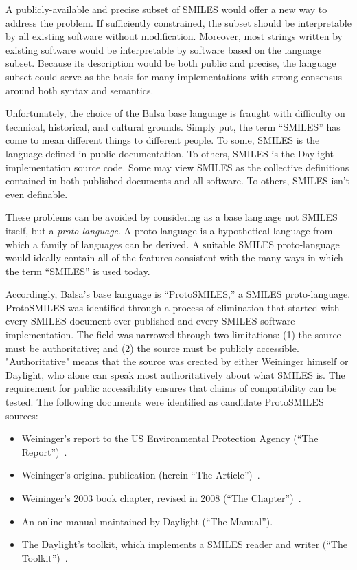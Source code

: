 \documentclass{article}
\begin{document}
A publicly-available and precise subset of SMILES would offer a new way to address the problem. If sufficiently constrained, the subset should be interpretable by all existing software without modification. Moreover, most strings written by existing software would be interpretable by software based on the language subset. Because its description would be both public and precise, the language subset could serve as the basis for many implementations with strong consensus around both syntax and semantics.

Unfortunately, the choice of the Balsa base language is fraught with difficulty on technical, historical, and cultural grounds. Simply put, the term \enquote{SMILES} has come to mean different things to different people. To some, SMILES is the language defined in public documentation. To others, SMILES is the Daylight implementation source code. Some may view SMILES as the collective definitions contained in both published documents and all software. To others, SMILES isn't even definable.

These problems can be avoided by considering as a base language not SMILES itself, but a \textit{proto-language}. A proto-language is a hypothetical language from which a family of languages can be derived. A suitable SMILES proto-language would ideally contain all of the features consistent with the many ways in which the term \enquote{SMILES} is used today.

Accordingly, Balsa's base language is \enquote{ProtoSMILES,} a SMILES proto-language. ProtoSMILES was identified through a process of elimination that started with every SMILES document ever published and every SMILES software implementation. The field was narrowed through two limitations: (1) the source must be authoritative; and (2) the source must be publicly accessible. "Authoritative" means that the source was created by either Weininger himself or Daylight, who alone can speak most authoritatively about what SMILES is. The requirement for public accessibility ensures that claims of compatibility can be tested. The following documents were identified as candidate ProtoSMILES sources:

\begin{itemize}
    \item Weininger's report to the US Environmental Protection Agency (\enquote{The Report})~\cite{anderson:1987}.
    \item Weininger's original publication (herein \enquote{The Article})~\cite{weininger:1988}.
    \item Weininger's 2003 book chapter, revised in 2008 (\enquote{The Chapter})~\cite{weininger:2003}.
    \item An online manual maintained by Daylight (\enquote{The Manual}).
    \item The Daylight's toolkit, which implements a SMILES reader and writer (\enquote{The Toolkit})~\cite{daylightToolkit}.
\end{itemize}
\end{document}
